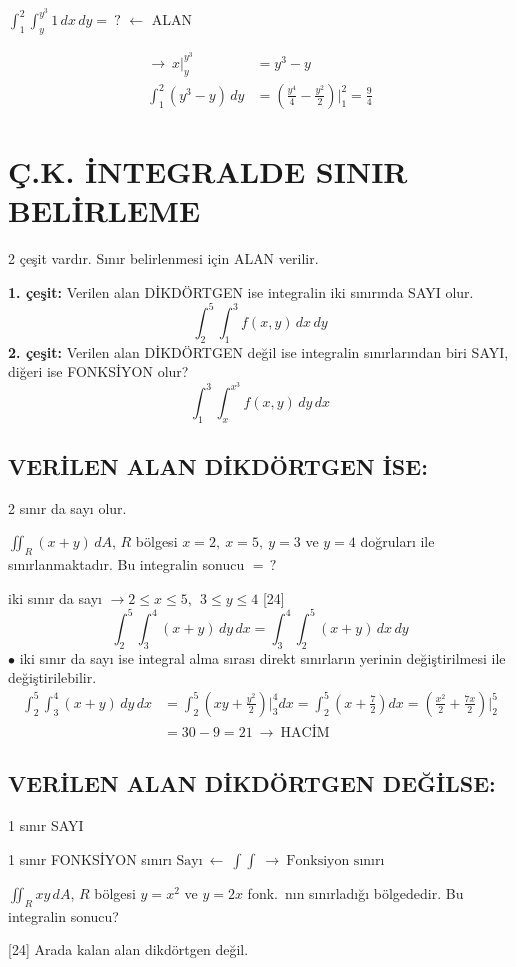 \documentclass[11pt,a4paper]{article}
\begin{document}
\begin{ornek}
$\displaystyle\int_1^2\int_y^{y^3}1\,dx\,dy=\ ?$ \quad $\longleftarrow$ ALAN
\end{ornek}
\begin{align*}
\longrightarrow\ x\Big|_y^{y^3}&=y^3-y\\
\int_1^2(y^3-y)\,dy&=\left(\frac{y^4}{4}-\frac{y^2}{2}\right)\Big|_1^2=\frac94
\end{align*}

\section{Ç.K. İNTEGRALDE SINIR BELİRLEME}
2 çeşit vardır. Sınır belirlenmesi için ALAN verilir.

\noindent\textbf{1. çeşit:} Verilen alan DİKDÖRTGEN ise integralin iki sınırında SAYI olur.
\[ \int_2^5\!\!\int_1^3 f(x,y)\,dx\,dy \]
\noindent\textbf{2. çeşit:} Verilen alan DİKDÖRTGEN değil ise integralin sınırlarından biri SAYI, diğeri ise FONKSİYON olur?
\[ \int_1^3\!\!\int_x^{x^3} f(x,y)\,dy\,dx \]

\subsection*{VERİLEN ALAN DİKDÖRTGEN İSE:}
2 sınır da sayı olur.
\begin{ornek}
$\displaystyle\iint_R (x+y)\,dA$, $R$ bölgesi $x=2,\ x=5,\ y=3$ ve $y=4$ doğruları ile sınırlanmaktadır. Bu integralin sonucu $=\,?$
\end{ornek}
iki sınır da sayı $\longrightarrow 2\le x\le 5,\ \ 3\le y\le 4$
[24]
\[ \int_2^5\!\!\int_3^4 (x+y)\,dy\,dx=\int_3^4\!\!\int_2^5 (x+y)\,dx\,dy \]
$\bullet$ iki sınır da sayı ise integral alma sırası direkt sınırların yerinin değiştirilmesi ile değiştirilebilir.
\begin{align*}
\int_2^5\!\!\int_3^4 (x+y)\,dy\,dx&=\int_2^5\left(xy+\frac{y^2}{2}\right)\Big|_3^4 dx=\int_2^5\left(x+\frac72\right)dx=\left(\frac{x^2}{2}+\frac{7x}{2}\right)\Big|_2^5\\
&=30-9=21\ \longrightarrow\ \text{HACİM}
\end{align*}

\subsection*{VERİLEN ALAN DİKDÖRTGEN DEĞİLSE:}
1 sınır SAYI

1 sınır FONKSİYON sınırı \qquad $\text{Sayı}\ \longleftarrow\ \int\!\!\int\ \longrightarrow\ \text{Fonksiyon sınırı}$
\begin{ornek}
$\displaystyle\iint_R xy\,dA$, $R$ bölgesi $y=x^2$ ve $y=2x$ fonk.\ nın sınırladığı bölgededir. Bu integralin sonucu?
\end{ornek}
[24]
Arada kalan alan dikdörtgen değil.
\end{document}
